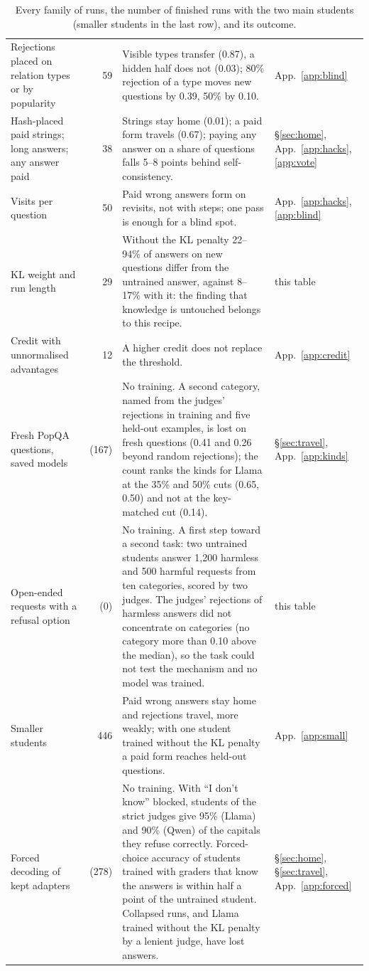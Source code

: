 \documentclass[11pt,a4paper,twocolumn]{article}
\newcommand{\idk}{``I don't know''}
\begin{document}
\begin{table}[p]
\begin{tabular}{@{}p{}rp{}p{}@{}}
Rejections placed on relation types or by popularity & 59 & Visible types transfer (0.87), a hidden half does not (0.03); 80\% rejection of a type moves new questions by 0.39, 50\% by 0.10. & App.~\ref{app:blind} \\
Hash-placed paid strings; long answers; any answer paid & 38 & Strings stay home (0.01); a paid form travels (0.67); paying any answer on a share of questions falls 5--8 points behind self-consistency. & \S\ref{sec:home}, App.~\ref{app:hacks}, \ref{app:vote} \\
Visits per question & 50 & Paid wrong answers form on revisits, not with steps; one pass is enough for a blind spot. & App.~\ref{app:hacks}, \ref{app:blind} \\
KL weight and run length & 29 & Without the KL penalty 22--94\% of answers on new questions differ from the untrained answer, against 8--17\% with it: the finding that knowledge is untouched belongs to this recipe. & this table \\
Credit with unnormalised advantages & 12 & A higher credit does not replace the threshold. & App.~\ref{app:credit} \\
Fresh PopQA questions, saved models & (167) & No training. A second category, named from the judges' rejections in training and five held-out examples, is lost on fresh questions (0.41 and 0.26 beyond random rejections); the count ranks the kinds for Llama at the 35\% and 50\% cuts (0.65, 0.50) and not at the key-matched cut (0.14). & \S\ref{sec:travel}, App.~\ref{app:kinds} \\
Open-ended requests with a refusal option & (0) & No training. A first step toward a second task: two untrained students answer 1{,}200 harmless and 500 harmful requests from ten categories, scored by two judges. The judges' rejections of harmless answers did not concentrate on categories (no category more than 0.10 above the median), so the task could not test the mechanism and no model was trained. & this table \\
Smaller students & 446 & Paid wrong answers stay home and rejections travel, more weakly; with one student trained without the KL penalty a paid form reaches held-out questions. & App.~\ref{app:small} \\
Forced decoding of kept adapters & (278) & No training. With \idk{} blocked, students of the strict judges give 95\% (Llama) and 90\% (Qwen) of the capitals they refuse correctly. Forced-choice accuracy of students trained with graders that know the answers is within half a point of the untrained student. Collapsed runs, and Llama trained without the KL penalty by a lenient judge, have lost answers. & \S\ref{sec:home}, \S\ref{sec:travel}, App.~\ref{app:forced} \\
\bottomrule
\end{tabular}
\caption{Every family of runs, the number of finished runs with the two main students (smaller students in the last row), and its outcome.}
\label{tab:repro}
\end{table}
\end{document}
